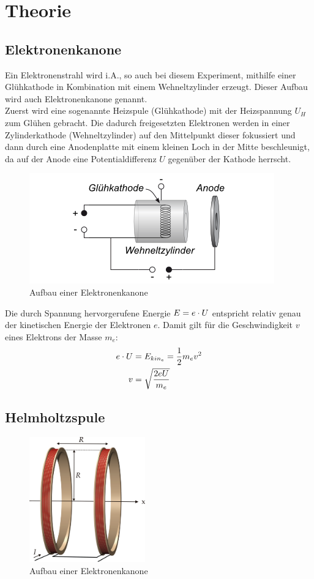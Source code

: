 \section{Theorie}

\subsection{Elektronenkanone}
Ein Elektronenstrahl wird i.A., so auch bei diesem Experiment, mithilfe einer Glühkathode in Kombination mit einem Wehneltzylinder
erzeugt. Dieser Aufbau wird auch Elektronenkanone genannt.\\
Zuerst wird eine sogenannte Heizspule (Glühkathode) mit der Heizspannung $U_H$ zum Glühen gebracht. Die dadurch freigesetzten Elektronen werden in einer
Zylinderkathode (Wehneltzylinder) auf den Mittelpunkt dieser fokussiert und dann durch eine Anodenplatte mit einem kleinen Loch in der Mitte beschleunigt, da auf der Anode eine Potentialdifferenz $U$ gegenüber der Kathode herrscht.\\
\begin{figure}[!htbp]
\centering
\includegraphics[scale = 0.9]{elektronenkanone.png}
\caption{Aufbau einer Elektronenkanone} \label{elektronenkanone}
\end{figure} \newline
Die durch Spannung hervorgerufene Energie $E=e\cdot U$ entspricht relativ genau der kinetischen Energie der Elektronen $e$. Damit gilt für die Geschwindigkeit $v$ eines Elektrons der Masse $m_e$:
\begin{align}
e\cdot U&=E_{kin_{e}}=\frac{1}{2}m_ev^2 \\
v&=\sqrt{\frac{2eU}{m_e}} \label{kanone}
\end{align}

\subsection{Helmholtzspule}

\begin{figure}[!htbp]
\centering
\includegraphics[width=5cm]{helmholtzspule.png}
\caption{Aufbau einer Elektronenkanone} \label{elektronenkanone}
\end{figure}

